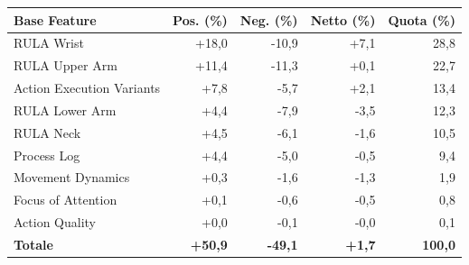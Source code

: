 \begin{tabular*}{\linewidth}{@{}l@{\extracolsep{\fill}}rrrr@{}}
\toprule
\textbf{Base Feature} & \textbf{Pos. (\%)} & \textbf{Neg. (\%)} & \textbf{Netto (\%)} & \textbf{Quota (\%)} \\
\midrule
RULA Wrist & +18{,}0 & -10{,}9 & +7{,}1 & 28{,}8 \\
RULA Upper Arm & +11{,}4 & -11{,}3 & +0{,}1 & 22{,}7 \\
Action Execution Variants & +7{,}8 & -5{,}7 & +2{,}1 & 13{,}4 \\
RULA Lower Arm & +4{,}4 & -7{,}9 & -3{,}5 & 12{,}3 \\
RULA Neck & +4{,}5 & -6{,}1 & -1{,}6 & 10{,}5 \\
Process Log & +4{,}4 & -5{,}0 & -0{,}5 & 9{,}4 \\
Movement Dynamics & +0{,}3 & -1{,}6 & -1{,}3 & 1{,}9 \\
Focus of Attention & +0{,}1 & -0{,}6 & -0{,}5 & 0{,}8 \\
Action Quality & +0{,}0 & -0{,}1 & -0{,}0 & 0{,}1 \\
\midrule
\textbf{Totale} & \textbf{+50{,}9} & \textbf{-49{,}1} & \textbf{+1{,}7} & \textbf{100{,}0} \\
\bottomrule
\end{tabular*}
